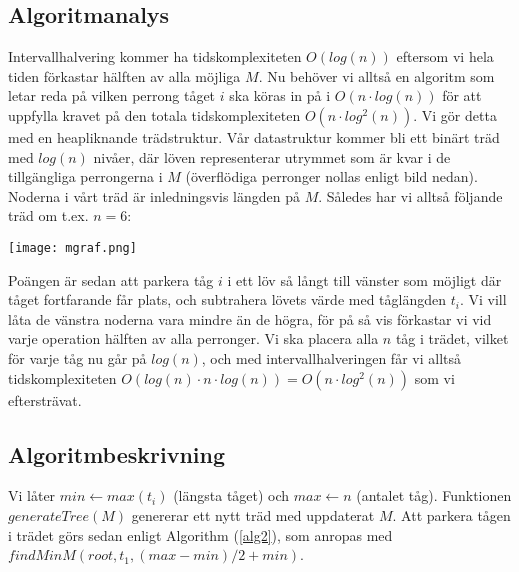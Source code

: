 \documentclass[11pt]{exam}
\begin{document}
\subsection{Algoritmanalys}

Intervallhalvering kommer ha tidskomplexiteten $O(log(n))$ eftersom vi hela tiden förkastar hälften av alla möjliga $M$. Nu behöver vi alltså en algoritm som letar reda på vilken perrong tåget $i$ ska köras in på i $O(n\cdot log(n))$ för att uppfylla kravet på den totala tidskomplexiteten $O(n\cdot log^2(n))$. Vi gör detta med en heapliknande trädstruktur. Vår datastruktur kommer bli ett binärt träd med $log(n)$ nivåer, där löven representerar utrymmet som är kvar i de tillgängliga perrongerna i $M$ (överflödiga perronger nollas enligt bild nedan). Noderna i vårt träd är inledningsvis längden på $M$. Således har vi alltså följande träd om t.ex. $n = 6$:
\begin{center}
\texttt{[image: mgraf.png]}
\end{center}

Poängen är sedan att parkera tåg $i$ i ett löv så långt till vänster som möjligt där tåget fortfarande får plats, och subtrahera lövets värde med tåglängden $t_i$. Vi vill låta de vänstra noderna vara mindre än de högra, för på så vis förkastar vi vid varje operation hälften av alla perronger. Vi ska placera alla $n$ tåg i trädet, vilket för varje tåg nu går på $log(n)$, och med intervallhalveringen får vi alltså tidskomplexiteten $O(log(n)\cdot n\cdot log(n)) = O(n\cdot log^2(n))$ som vi eftersträvat. 

\subsection{Algoritmbeskrivning}
Vi låter $min \leftarrow max(t_i)$ (längsta tåget) och $max \leftarrow n$ (antalet tåg). Funktionen $generateTree(M)$ genererar ett nytt träd med uppdaterat $M$. Att parkera tågen i trädet görs sedan enligt Algorithm (\ref{alg2}), som anropas med $findMinM(root, t_1, (max - min)/2 + min)$.
\end{document}
